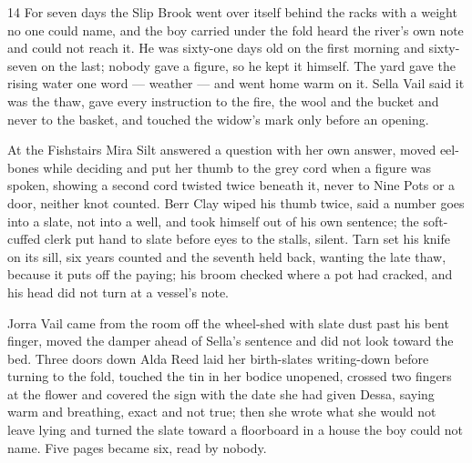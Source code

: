 






\CRtailpiece
\begin{CRchronicle}{14}
For seven days the Slip Brook went over itself behind the racks with a weight no one could name, and the boy carried under the fold heard the river’s own note and could not reach it. He was sixty-one days old on the first morning and sixty-seven on the last; nobody gave a figure, so he kept it himself. The yard gave the rising water one word --- weather --- and went home warm on it. Sella Vail said it was the thaw, gave every instruction to the fire, the wool and the bucket and never to the basket, and touched the widow’s mark only before an opening.

At the Fishstairs Mira Silt answered a question with her own answer, moved eel-bones while deciding and put her thumb to the grey cord when a figure was spoken, showing a second cord twisted twice beneath it, never to Nine Pots or a door, neither knot counted. Berr Clay wiped his thumb twice, said a number goes into a slate, not into a well, and took himself out of his own sentence; the soft-cuffed clerk put hand to slate before eyes to the stalls, silent. Tarn set his knife on its sill, six years counted and the seventh held back, wanting the late thaw, because it puts off the paying; his broom checked where a pot had cracked, and his head did not turn at a vessel’s note.

Jorra Vail came from the room off the wheel-shed with slate dust past his bent finger, moved the damper ahead of Sella’s sentence and did not look toward the bed. Three doors down Alda Reed laid her birth-slates writing-down before turning to the fold, touched the tin in her bodice unopened, crossed two fingers at the flower and covered the sign with the date she had given Dessa, saying warm and breathing, exact and not true; then she wrote what she would not leave lying and turned the slate toward a floorboard in a house the boy could not name. Five pages became six, read by nobody.


\end{CRchronicle}
